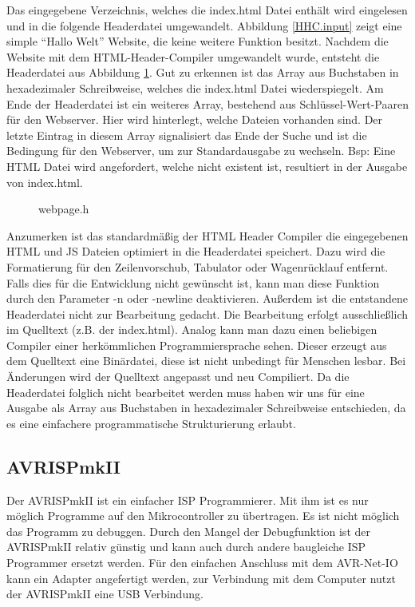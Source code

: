 Das eingegebene Verzeichnis, welches die \textrm{index.html} Datei enthält wird
eingelesen und in die folgende Headerdatei umgewandelt.
Abbildung \ref{HHC.input} zeigt eine simple "`Hallo Welt"' Website, die keine
weitere Funktion besitzt. Nachdem die Website mit dem HTML-Header-Compiler
umgewandelt wurde, entsteht die Headerdatei aus Abbildung \ref{HHC.output}. Gut
zu erkennen ist das Array aus Buchstaben in hexadezimaler Schreibweise, welches die
index.html Datei wiederspiegelt.
Am Ende der Headerdatei ist ein weiteres Array, bestehend aus Schlüssel-Wert-Paaren 
für den Webserver. Hier wird hinterlegt, welche Dateien vorhanden sind.
Der letzte Eintrag in diesem Array signalisiert das Ende der Suche und ist die
Bedingung für den Webserver, um zur Standardausgabe zu wechseln. Bsp: Eine HTML
Datei wird angefordert, welche nicht existent ist, resultiert in der Ausgabe von
index.html.

\begin{figure}[H]

\caption{webpage.h}
\label{HHC.output}
\end{figure}

Anzumerken ist das standardmäßig der HTML Header Compiler die eingegebenen HTML
und JS Dateien optimiert in die Headerdatei speichert. Dazu wird die
Formatierung für den Zeilenvorschub, Tabulator oder Wagenrücklauf entfernt.
Falls dies für die Entwicklung nicht gewünscht ist, kann man diese Funktion
durch den Parameter \textrm{-n oder -newline} deaktivieren.
Außerdem ist die entstandene Headerdatei nicht zur Bearbeitung gedacht. Die
Bearbeitung erfolgt ausschließlich im Quelltext (z.B. der index.html). Analog
kann man dazu einen beliebigen Compiler einer herkömmlichen Programmiersprache sehen. Dieser
erzeugt aus dem Quelltext eine Binärdatei, diese ist nicht unbedingt
für Menschen lesbar. Bei Änderungen wird der Quelltext angepasst und neu
Compiliert. Da die Headerdatei folglich nicht bearbeitet werden muss haben wir
uns für eine Ausgabe als Array aus Buchstaben in hexadezimaler Schreibweise
entschieden, da es eine einfachere programmatische Strukturierung erlaubt.

\subsection{AVRISPmkII}

Der AVRISPmkII ist ein einfacher \ac{ISP} Programmierer. Mit ihm ist es nur
möglich Programme auf den Mikrocontroller zu übertragen. Es ist nicht möglich
das Programm zu debuggen. Durch den Mangel der Debugfunktion ist der AVRISPmkII
relativ günstig und kann auch durch andere baugleiche \ac{ISP} Programmer ersetzt
werden. Für den einfachen Anschluss mit dem AVR-Net-IO kann ein Adapter
angefertigt werden, zur Verbindung mit dem Computer nutzt der AVRISPmkII eine
USB Verbindung.


